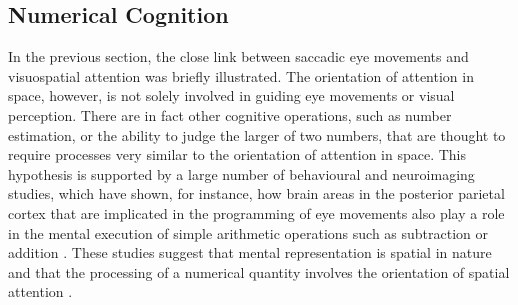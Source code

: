 \documentclass[11pt]{article}
\begin{document}
\subsection{Numerical Cognition}
In the previous section, the close link between saccadic eye movements and visuospatial attention was briefly illustrated. The orientation of attention in space, however, is not solely involved in guiding eye movements or visual perception. There are in fact other cognitive operations, such as number estimation, or the ability to judge the larger of two numbers, that are thought to require processes very similar to the orientation of attention in space. This hypothesis is supported by a large number of behavioural and neuroimaging studies, which have shown, for instance, how brain areas in the posterior parietal cortex that are implicated in the programming of eye movements also play a role in the mental execution of simple arithmetic operations such as subtraction or addition \cite{Knops2009}. These studies suggest that mental representation is spatial in nature and that the processing of a numerical quantity involves the orientation of spatial attention \cite{Hubbard2005}.
\end{document}
